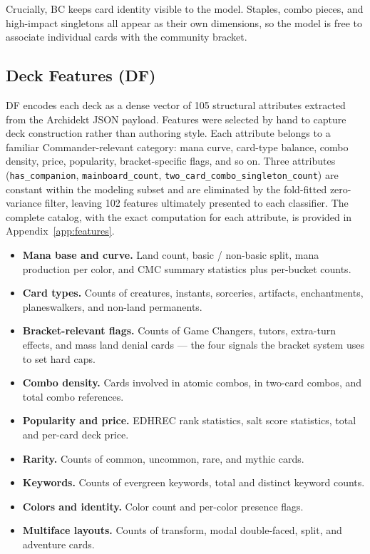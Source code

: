 \documentclass{article}
\begin{document}
Crucially, BC keeps card identity visible to the model. Staples, combo pieces, and high-impact singletons all appear as their own dimensions, so the model is free to associate individual cards with the community bracket.

\subsection{Deck Features (DF)}
\label{sec:data:df}

DF encodes each deck as a dense vector of 105 structural attributes extracted from the Archidekt JSON payload. Features were selected by hand to capture deck construction rather than authoring style. Each attribute belongs to a familiar Commander-relevant category: mana curve, card-type balance, combo density, price, popularity, bracket-specific flags, and so on. Three attributes (\texttt{has\_companion}, \texttt{mainboard\_count}, \texttt{two\_card\_combo\_singleton\_count}) are constant within the modeling subset and are eliminated by the fold-fitted zero-variance filter, leaving 102 features ultimately presented to each classifier. The complete catalog, with the exact computation for each attribute, is provided in Appendix~\ref{app:features}.

\begin{itemize}
  \item \textbf{Mana base and curve.} Land count, basic / non-basic split, mana production per color, and CMC summary statistics plus per-bucket counts.
  \item \textbf{Card types.} Counts of creatures, instants, sorceries, artifacts, enchantments, planeswalkers, and non-land permanents.
  \item \textbf{Bracket-relevant flags.} Counts of Game Changers, tutors, extra-turn effects, and mass land denial cards --- the four signals the bracket system uses to set hard caps.
  \item \textbf{Combo density.} Cards involved in atomic combos, in two-card combos, and total combo references.
  \item \textbf{Popularity and price.} EDHREC rank statistics, salt score statistics, total and per-card deck price.
  \item \textbf{Rarity.} Counts of common, uncommon, rare, and mythic cards.
  \item \textbf{Keywords.} Counts of evergreen keywords, total and distinct keyword counts.
  \item \textbf{Colors and identity.} Color count and per-color presence flags.
  \item \textbf{Multiface layouts.} Counts of transform, modal double-faced, split, and adventure cards.
\end{itemize}
\end{document}
